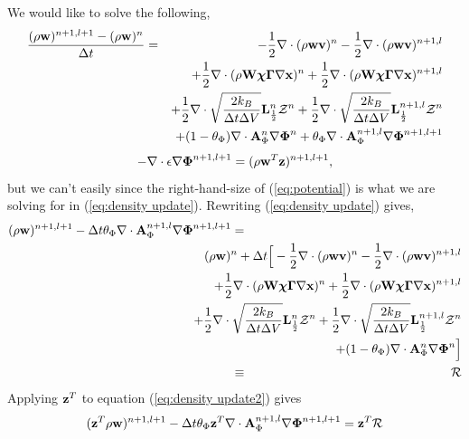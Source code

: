 \documentclass[final]{siamltex}
\def\Ab {{\bf A}}
\def\Lb {{\bf L}}
\def\vb {{\bf v}}
\def\wb {{\bf w}}
\def\Wb {{\bf W}}
\def\xb {{\bf x}}
\def\zb {{\bf z}}
\def\chib   {\boldsymbol{\chi}}
\def\Gammab {\boldsymbol{\Gamma}}
\def\Phib   {\boldsymbol{\Phi}}
\def\half   {\frac{1}{2}}
\begin{document}
We would like to solve the following,
\begin{eqnarray}
\frac{(\rho\wb)^{n+1,l+1} - (\rho\wb)^n}{\Delta t} &=&  -\half\nabla\cdot(\rho\wb\vb)^n - \half\nabla\cdot(\rho\wb\vb)^{n+1,l}\nonumber\\
&&+ \half\nabla\cdot(\rho\Wb\chib\Gammab\nabla\xb)^n + \half\nabla\cdot(\rho\Wb\chib\Gammab\nabla\xb)^{n+1,l} \nonumber\\
&&+ \half\nabla\cdot\sqrt{\frac{2k_B}{\Delta t\Delta V}}\Lb_\half^n\mathcal{Z}^n
+ \half\nabla\cdot\sqrt{\frac{2k_B}{\Delta t\Delta V}}\Lb_\half^{n+1,l}\mathcal{Z}^n\nonumber\\
&&+ (1-\theta_\Phi)\nabla\cdot \Ab_\Phi^n\nabla\Phib^n + \theta_\Phi\nabla\cdot \Ab_\Phi^{n+1,l}\nabla\Phib^{n+1,l+1}
\label{eq:density update}
\end{eqnarray}
\begin{equation}
-\nabla\cdot\epsilon\nabla\Phib^{n+1,l+1} = (\rho\wb^T\zb)^{n+1,l+1},\label{eq:potential}
\end{equation}
but we can't easily since the right-hand-size of (\ref{eq:potential}) is what we are
solving for in (\ref{eq:density update}).  Rewriting (\ref{eq:density update}) gives,
\begin{eqnarray}
(\rho\wb)^{n+1,l+1} - \Delta t\theta_\Phi\nabla\cdot \Ab_\Phi^{n+1,l}\nabla\Phib^{n+1,l+1} &=& \nonumber\\
&&\hspace{-1.5in}(\rho\wb)^n + \Delta t\Big[-\half\nabla\cdot(\rho\wb\vb)^n -\half\nabla\cdot(\rho\wb\vb)^{n+1,l}\nonumber\\
&&\hspace{-.7in}+ \half\nabla\cdot(\rho\Wb\chib\Gammab\nabla\xb)^n + \half\nabla\cdot(\rho\Wb\chib\Gammab\nabla\xb)^{n+1,l}\nonumber\\
&&\hspace{-.7in}+ \half\nabla\cdot\sqrt{\frac{2k_B}{\Delta t\Delta V}}\Lb_\half^n\mathcal{Z}^n + \half\nabla\cdot\sqrt{\frac{2k_B}{\Delta t\Delta V}}\Lb_\half^{n+1,l}\mathcal{Z}^n\nonumber\\
&&\hspace{-.7in}+ (1-\theta_\Phi)\nabla\cdot \Ab_\Phi^n\nabla\Phib^n\Big]\nonumber\\
&\equiv& \mathcal{R}\label{eq:density update2}
\end{eqnarray}
Applying $\zb^T$ to equation (\ref{eq:density update2}) gives
\begin{equation}
(\zb^T\rho\wb)^{n+1,l+1} - \Delta t\theta_\Phi\zb^T\nabla\cdot \Ab_\Phi^{n+1,l}\nabla\Phib^{n+1,l+1} = \zb^T\mathcal{R}\label{eq:density update3}
\end{equation}
\end{document}
